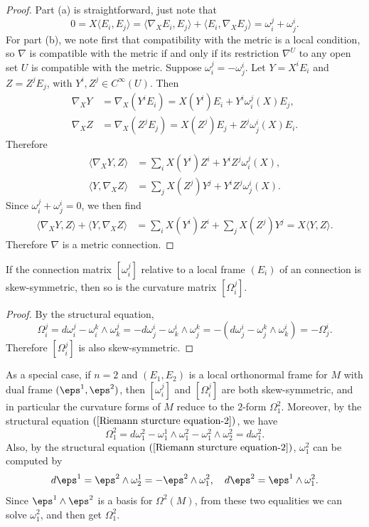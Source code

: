 \begin{proof}
Part (a) is straightforward, just note that
\[0=X\langle E_i,E_j\rangle=\langle\nabla_XE_i,E_j\rangle+\langle E_i,\nabla_XE_j\rangle=\omega_i^j+\omega_j^i.\]
For part (b), we note first that compatibility with the metric is a local condition, so $\nabla$ is compatible with the metric if and only if its restriction $\nabla^U$ 
to any open set $U$ is compatible with the metric. Suppose $\omega_i^j=-\omega_j^i$. Let $Y=X^iE_i$ and $Z=Z^jE_j$, with $Y^i,Z^j\in C^{\infty}(U)$. Then
\begin{align*}
\nabla_XY&=\nabla_X(Y^iE_i)=X(Y^i)E_i+Y^i\omega_i^j(X)E_j,\\
\nabla_XZ&=\nabla_X(Z^jE_j)=X(Z^j)E_j+Z^j\omega_j^i(X)E_i.
\end{align*}
Therefore 
\begin{align*}
\langle\nabla_XY,Z\rangle&=\sum_iX(Y^i)Z^i+Y^iZ^j\omega_i^j(X),\\
\langle Y,\nabla_XZ\rangle&=\sum_jX(Z^j)Y^j+Y^iZ^j\omega_j^i(X).
\end{align*}
Since $\omega_i^j+\omega_j^i=0$, we then find
\begin{align*}
\langle\nabla_XY,Z\rangle+\langle Y,\nabla_XZ\rangle&=\sum_iX(Y^i)Z^i+\sum_jX(Z^j)Y^j=X\langle Y,Z\rangle.
\end{align*}
Therefore $\nabla$ is a metric connection.
\end{proof}
\begin{proposition}
If the connection matrix $[\omega_i^j]$ relative to a local frame $(E_i)$ of an connection is skew-symmetric, then so is the curvature matrix $[\Omega_i^j]$.
\end{proposition}
\begin{proof}
By the structural equation,
\[\Omega_i^j=d\omega_i^j-\omega_i^k\wedge\omega_k^j=-d\omega_j^i-\omega_k^i\wedge\omega^k_j=-(d\omega_j^i-\omega_j^k\wedge\omega_k^i)=-\Omega_j^i.\]
Therefore $[\Omega_i^j]$ is also skew-symmetric.
\end{proof}
\begin{example}
As a special case, if $n=2$ and $(E_1,E_2)$ is a local orthonormal frame for $M$ with dual frame $(\eps^1,\eps^2)$, then $[\omega_i^j]$ and $[\Omega_i^j]$ are both skew-symmetric, and in particular the curvature forms of $M$ reduce to the $2$-form $\Omega_1^2$. Moreover, by the structural equation $(\ref{Riemann sturcture equation-2})$, we have
\[\Omega_1^2=d\omega_1^2-\omega_1^1\wedge\omega_1^2-\omega_1^2\wedge\omega_2^2=d\omega_1^2.\]
Also, by the structural equation $(\ref{Riemann sturcture equation-2})$, $\omega_1^2$ can be computed by
\[d\eps^1=\eps^2\wedge\omega_2^1=-\eps^2\wedge\omega_1^2,\quad d\eps^2=\eps^1\wedge\omega_1^2.\]
Since $\eps^1\wedge\eps^2$ is a basis for $\Omega^2(M)$, from these two equalities we can solve $\omega_1^2$, and then get $\Omega_1^2$.
\end{example}
